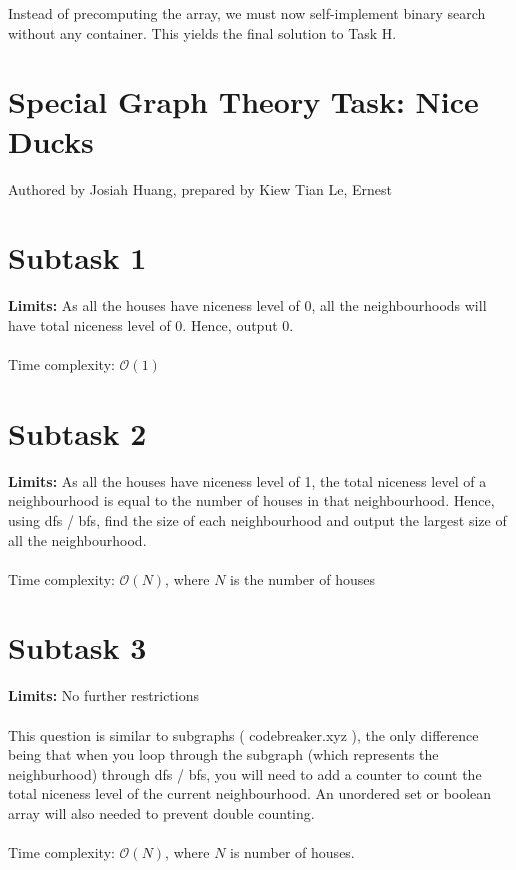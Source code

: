 \documentclass{report}
\begin{document}
Instead of precomputing the array, we must now self-implement binary search without any container. This yields the final solution to Task H.

\pagebreak

\section*{Special Graph Theory Task: Nice Ducks}
Authored by Josiah Huang, prepared by Kiew Tian Le, Ernest

\section*{Subtask 1}
\textbf{Limits: } As all the houses have niceness level of 0, all the neighbourhoods will have total niceness level of 0. Hence, output 0.\\\\

Time complexity: $\mathcal{O}(1)$

\section*{Subtask 2}
\textbf{Limits: } As all the houses have niceness level of 1, the total niceness level of a neighbourhood is equal to the number of houses in that neighbourhood. Hence, using dfs / bfs, find the size of each neighbourhood and output the largest size of all the neighbourhood.
\\\\
Time complexity: $\mathcal{O}(N)$, where $N$ is the number of houses

\section*{Subtask 3}
\textbf{Limits: } No further restrictions
\\\\
This question is similar to subgraphs ( codebreaker.xyz ), the only difference being that when you loop through the subgraph (which represents the neighburhood) through dfs / bfs, you will need to add a counter to count the total niceness level of the current neighbourhood. An unordered set or boolean array will also needed to prevent double counting.
\\\\
Time complexity: $\mathcal{O}(N)$, where $N$ is number of houses.

\pagebreak
\end{document}
